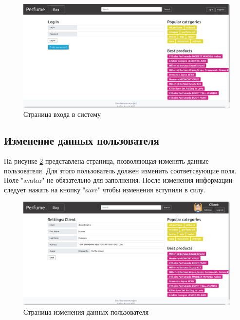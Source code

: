 \captionsetup{singlelinecheck = false, justification=centering}
\begin{figure}[h!]
	\begin{center}
		\includegraphics[scale=0.45]{assets/site_login.jpg}
	\end{center}
	\caption{Страница входа в систему}
	\label{site_login}
\end{figure}

\subsection{Изменение данных пользователя}

На рисунке \ref{site_settings} представлена страница, позволяющая изменять данные пользователя. Для этого пользователь должен изменить соответсвующие поля. Поле "avatar" не обязательно для заполнения. После изменения информации следует нажать на кнопку "save" чтобы изменения вступили в силу.

\captionsetup{singlelinecheck = false, justification=centering}
\begin{figure}[h!]
	\begin{center}
		\includegraphics[scale=0.45]{assets/site_settings.jpg}
	\end{center}
	\caption{Страница изменения данных пользователя}
	\label{site_settings}
\end{figure}

